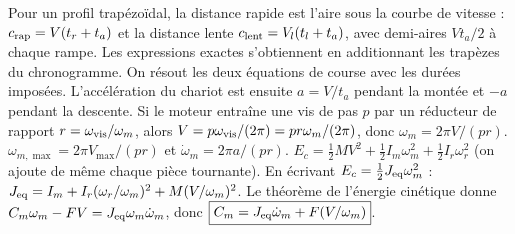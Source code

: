 \begin{corrigebox}
Pour un profil trapézoïdal, la distance rapide est l'aire sous la
                courbe de vitesse : $c_{\rm rap}=V(t_r+t_a)$ et la distance lente
                $c_{\rm lent}=V_l(t_l+t_a)$, avec demi-aires $Vt_a/2$ à chaque rampe.
                Les expressions exactes s'obtiennent en additionnant les trapèzes du
                chronogramme.
On résout les deux équations de course avec les durées imposées.
                L'accélération du chariot est ensuite $a=V/t_a$ pendant la montée et
                $-a$ pendant la descente.
Si le moteur entraîne une vis de pas $p$ par un réducteur de rapport
                $r=\omega_{\rm vis}/\omega_m$, alors
                $V=p\omega_{\rm vis}/(2\pi)=pr\omega_m/(2\pi)$, donc
                $\omega_m=2\pi V/(pr)$.
$\omega_{m,\max}=2\pi V_{\max}/(pr)$ et
                $\dot\omega_m=2\pi a/(pr)$.
$E_c=\tfrac12MV^2+\tfrac12I_m\omega_m^2+
                \tfrac12I_r\omega_r^2$ (on ajoute de même chaque pièce tournante).
En écrivant $E_c=\tfrac12J_{\rm eq}\omega_m^2$ :
                $J_{\rm eq}=I_m+I_r(\omega_r/\omega_m)^2+M(V/\omega_m)^2$.
Le théorème de l'énergie cinétique donne
                $C_m\omega_m-FV=J_{\rm eq}\omega_m\dot\omega_m$, donc
                $\boxed{C_m=J_{\rm eq}\dot\omega_m+F(V/\omega_m)}$.
\end{corrigebox}
